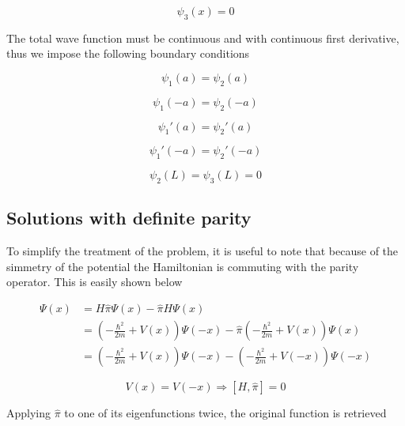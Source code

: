 \documentclass{article}
\begin{document}
\begin{equation}
\psi_{3}(x) = 0
\end{equation}

The total wave function must be continuous and with continuous first derivative, thus we impose the following boundary conditions

\begin{equation}
\label{eq:continuity}
\psi_{1}(a) =  \psi_{2}(a)
\end{equation}

\begin{equation}
\psi_{1}(-a) =  \psi_{2}(-a)
\end{equation}

\begin{equation}
\label{eq:continuity_derivative}
\psi_{1}'(a) =  \psi_{2}'(a)
\end{equation}

\begin{equation}
\psi_{1}'(-a) =  \psi_{2}'(-a)
\end{equation}

\begin{equation}
\label{eq:null_bound}
\psi_{2}(L) =  \psi_{3}(L) = 0
\end{equation}

\subsection{Solutions with definite parity}
To simplify the treatment of the problem, it is useful to note that because of the simmetry of the potential the Hamiltonian is commuting with the parity operator. This is easily shown below

\begin{align*}
[H, \hat{\pi}] \Psi(x) & = H \hat{\pi} \Psi(x) - \hat{\pi} H \Psi(x) \\ 
  & = \left(-\frac{\hbar^2}{2m} + V(x)\right)\Psi(-x) -  \hat{\pi} \left(-\frac{\hbar^2}{2m} + V(x)\right)\Psi(x) \\ & = \left(-\frac{\hbar^2}{2m} + V(x)\right)\Psi(-x) -  \left(-\frac{\hbar^2}{2m} + V(-x)\right)\Psi(-x)
\end{align*}

\begin{equation}
\label{eq:parity_commutation}
V(x) = V(-x) \Rightarrow \left[H,\hat{\pi} \right] = 0
\end{equation}

Applying \(\hat{\pi}\) to one of its eigenfunctions twice, the original function is retrieved
\end{document}
